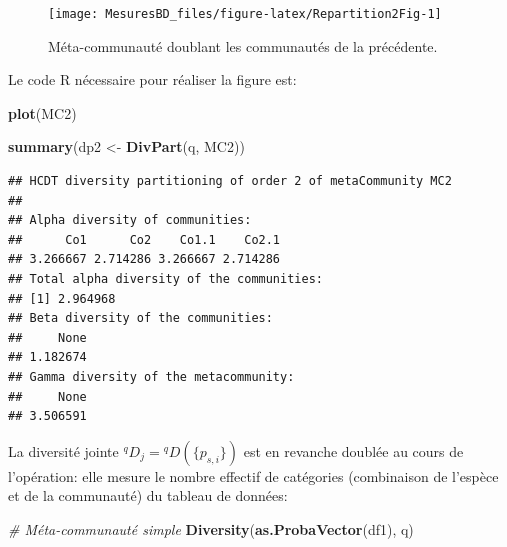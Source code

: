 \documentclass[
  11pt,
  french,
  a4paper,
  extrafontsizes,onecolumn,openright
  ]{memoir}
\newenvironment{Shaded}{\begin{snugshade}}{\end{snugshade}}
\newcommand{\CommentTok}[1]{\textcolor[rgb]{0.56,0.35,0.01}{\textit{#1}}}
\newcommand{\KeywordTok}[1]{\textcolor[rgb]{0.13,0.29,0.53}{\textbf{#1}}}
\newcommand{\NormalTok}[1]{#1}
\newcommand{\StringTok}[1]{\textcolor[rgb]{0.31,0.60,0.02}{#1}}
\begin{document}
\normalsize

\scriptsize

\begin{figure}

{\centering \texttt{[image: MesuresBD\_files/figure-latex/Repartition2Fig-1]} 

}

\caption{Méta-communauté doublant les communautés de la précédente.}\label{fig:Repartition2Fig}
\end{figure}

\normalsize

Le code R nécessaire pour réaliser la figure est:

\scriptsize

\begin{Shaded}
\begin{Highlighting}[]
\KeywordTok{plot}\NormalTok{(MC2)}
\end{Highlighting}
\end{Shaded}

\normalsize

\scriptsize

\begin{Shaded}
\begin{Highlighting}[]
\KeywordTok{summary}\NormalTok{(dp2 <-}\StringTok{ }\KeywordTok{DivPart}\NormalTok{(q, MC2))}
\end{Highlighting}
\end{Shaded}

\begin{verbatim}
## HCDT diversity partitioning of order 2 of metaCommunity MC2
## 
## Alpha diversity of communities: 
##      Co1      Co2    Co1.1    Co2.1 
## 3.266667 2.714286 3.266667 2.714286 
## Total alpha diversity of the communities: 
## [1] 2.964968
## Beta diversity of the communities: 
##     None 
## 1.182674 
## Gamma diversity of the metacommunity: 
##     None 
## 3.506591
\end{verbatim}

\normalsize

La diversité jointe \(^{q}\!D_{j}={^{q}\!D}(\{p_{s,i}\})\) est en revanche doublée au cours de l'opération: elle mesure le nombre effectif de catégories (combinaison de l'espèce et de la communauté) du tableau de données:

\scriptsize

\begin{Shaded}
\begin{Highlighting}[]
\CommentTok{# Méta-communauté simple}
\KeywordTok{Diversity}\NormalTok{(}\KeywordTok{as.ProbaVector}\NormalTok{(df1), q)}
\end{Highlighting}
\end{Shaded}
\end{document}
